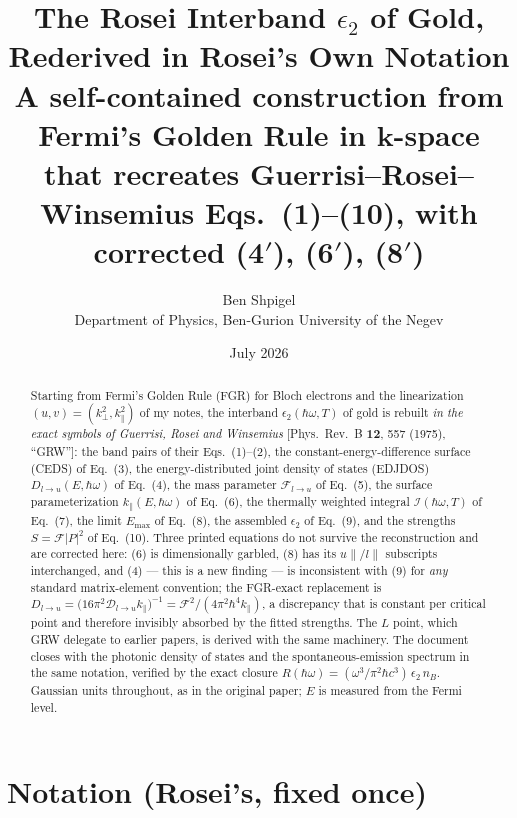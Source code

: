 \documentclass[11pt,a4paper]{article}
\title{\bfseries The Rosei Interband $\epsilon_2$ of Gold, Rederived in
Rosei's Own Notation\\[4pt]
\large A self-contained construction from Fermi's Golden Rule in
$\mathbf{k}$-space that recreates Guerrisi--Rosei--Winsemius
Eqs.~(1)--(10), with corrected (4$'$), (6$'$), (8$'$)}
\author{Ben Shpigel\\ \small Department of Physics, Ben-Gurion University of the Negev}
\date{July 2026}
\numberwithin{equation}{section}
\newcommand{\hw}{\hbar\omega}
\newcommand{\cD}{\mathcal{D}}
\newcommand{\cF}{\mathcal{F}}
\newcommand{\cI}{\mathcal{I}}
\newcommand{\kperp}{k_{\perp}}
\newcommand{\kpar}{k_{\parallel}}
\begin{document}
\maketitle

\begin{abstract}
\noindent
Starting from Fermi's Golden Rule (FGR) for Bloch electrons and the
linearization $(u,v)=(\kperp^2,\kpar^2)$ of my notes, the interband
$\epsilon_2(\hw,T)$ of gold is rebuilt \emph{in the exact symbols of
Guerrisi, Rosei and Winsemius} [Phys.\ Rev.\ B \textbf{12}, 557
(1975), ``GRW'']: the band pairs of their Eqs.~(1)--(2), the
constant-energy-difference surface (CEDS) of Eq.~(3), the
energy-distributed joint density of states (EDJDOS)
$D_{l\to u}(E,\hw)$ of Eq.~(4), the mass parameter
$\cF_{l\to u}$ of Eq.~(5), the surface parameterization $\kpar(E,\hw)$
of Eq.~(6), the thermally weighted integral $\cI(\hw,T)$ of Eq.~(7),
the limit $E_{\max}$ of Eq.~(8), the assembled $\epsilon_2$ of
Eq.~(9), and the strengths $S=\cF|P|^2$ of Eq.~(10).  Three printed
equations do not survive the reconstruction and are corrected here:
(6) is dimensionally garbled, (8) has its $u\!\parallel$/$l\!\parallel$
subscripts interchanged, and (4) --- this is a new finding --- is
inconsistent with (9) for \emph{any} standard matrix-element
convention; the FGR-exact replacement is
$D_{l\to u}=\bigl(16\pi^2\cD_{l\to u}\kpar\bigr)^{-1}
=\cF^2/(4\pi^2\hbar^4\kpar)$, a discrepancy that is constant per
critical point and therefore invisibly absorbed by the fitted
strengths.  The $L$ point, which GRW delegate to earlier papers, is
derived with the same machinery.  The document closes with the
photonic density of states and the spontaneous-emission spectrum in
the same notation, verified by the exact closure
$R(\hw)=(\omega^3/\pi^2\hbar c^3)\,\epsilon_2\,n_B$.
Gaussian units throughout, as in the original paper; $E$ is measured
from the Fermi level.
\end{abstract}

\tableofcontents

\section{Notation (Rosei's, fixed once)}\label{sec:notation}
\end{document}
